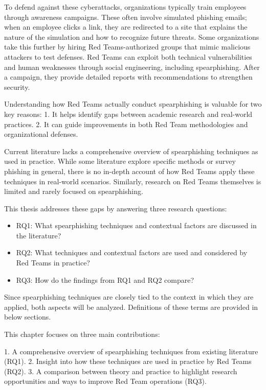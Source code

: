 To defend against these cyberattacks, organizations typically train employees through awareness campaigns. These often involve simulated phishing emails; when an employee clicks a link, they are redirected to a site that explains the nature of the simulation and how to recognize future threats. Some organizations take this further by hiring Red Teams-authorized groups that mimic malicious attackers to test defenses. Red Teams can exploit both technical vulnerabilities and human weaknesses through social engineering, including spearphishing. After a campaign, they provide detailed reports with recommendations to strengthen security.

Understanding how Red Teams actually conduct spearphishing is valuable for two key reasons:
1. It helps identify gaps between academic research and real-world practices.
2. It can guide improvements in both Red Team methodologies and organizational defenses.

Current literature lacks a comprehensive overview of spearphishing techniques as used in practice. While some literature explore specific methods or survey phishing in general, there is no in-depth account of how Red Teams apply these techniques in real-world scenarios. Similarly, research on Red Teams themselves is limited and rarely focused on spearphishing.

This thesis addresses these gaps by answering three research questions:
\begin{itemize}
    \item RQ1: What spearphishing techniques and contextual factors are discussed in the literature?
    \item RQ2: What techniques and contextual factors are used and considered by Red Teams in practice?
    \item RQ3: How do the findings from RQ1 and RQ2 compare?
\end{itemize}

Since spearphishing techniques are closely tied to the context in which they are applied, both aspects will be analyzed. Definitions of these terms are provided in below sections.

This chapter focuses on three main contributions:

1. A comprehensive overview of spearphishing techniques from existing literature (RQ1).
2. Insight into how these techniques are used in practice by Red Teams (RQ2).
3. A comparison between theory and practice to highlight research opportunities and ways to improve Red Team operations (RQ3).

